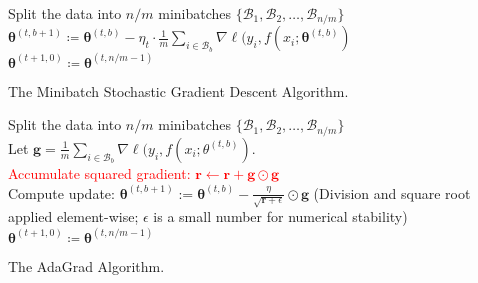 \documentclass[12pt,a4paper]{article}
\begin{document}
\begin{algorithm}[H]


    {   
        Split the data into $n/m$ minibatches $\{\mathcal{B}_1, \mathcal{B}_2, \ldots, \mathcal{B}_{n/m}\}$\\
        {
            $\boldsymbol{\theta}^{(t, b+1)} \coloneqq \boldsymbol{\theta}^{(t, b)} - \eta_t \cdot \frac{1}{m} \sum_{i \in \mathcal{B}_b} \nabla \ell(y_i, f(x_i; \boldsymbol{\theta}^{(t, b)})$\\
        }
        $\boldsymbol{\theta}^{(t+1, 0)} \coloneqq \boldsymbol{\theta}^{(t, n/m-1)}$\\
    }

	\caption{The Minibatch Stochastic Gradient Descent Algorithm.}
\end{algorithm}

\begin{algorithm}[H]


    {   
        Split the data into $n/m$ minibatches $\{\mathcal{B}_1, \mathcal{B}_2, \ldots, \mathcal{B}_{n/m}\}$\\
        {
            Let $\boldsymbol{g} = \frac{1}{m} \sum_{i \in \mathcal{B}_b} \nabla \ell(y_i, f(x_i; \theta^{(t, b)})$.\\
            \textcolor{red}{Accumulate squared gradient: $\boldsymbol{r} \leftarrow \boldsymbol{r} + \boldsymbol{g} \odot \boldsymbol{g}$}\\
            Compute update: $\boldsymbol{\theta}^{(t, b+1)} := \boldsymbol{\theta}^{(t, b)} - \frac{\eta}{\sqrt{\boldsymbol{r} + \epsilon}} \odot \boldsymbol{g}$ (Division and square root applied element-wise; $\epsilon$ is a small number for numerical stability)\\
        }
        $\boldsymbol{\theta}^{(t+1, 0)} \coloneqq \boldsymbol{\theta}^{(t, n/m-1)}$\\
    }

	\caption{The AdaGrad Algorithm.}
\end{algorithm}
\end{document}
